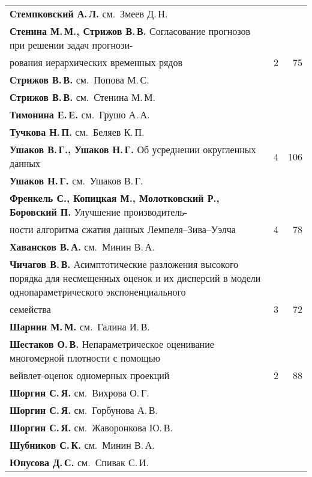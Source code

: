 {\begin{tabular}{p{388pt}rr}
\textbf{Стемпковский А.\,Л.} см.\ Змеев Д.\,Н.&&\\[-.35pt]
\textbf{Стенина М.\,М., Стрижов В.\,В.} Согласование прогнозов при
решении задач прогнози-\linebreak
\\[-12pt]
\hspace*{21pt}рования иерархических временных рядов&2&75\\[-.35pt]
\textbf{Стрижов В.\,В.} см.\ Попова М.\,С.&&\\[-.35pt]
\textbf{Стрижов В.\,В.} см.\ Стенина М.\,М.&&\\[-.35pt]
\textbf{Тимонина Е.\,Е.} см.\ Грушо А.\,А.&&\\[-.35pt]
\textbf{Тучкова Н.\,П.} см.\ Беляев К.\,П.&&\\[-.35pt]
\textbf{Ушаков В.\,Г., Ушаков Н.\,Г.} Об усреднении округленных
данных&4&106\\[-.35pt]
\textbf{Ушаков Н.\,Г.} см.\ Ушаков В.\,Г.&&\\[-.35pt]
\textbf{Френкель С., Копицкая М., Молотковский Р., Боровский П.}
Улучшение производитель-\linebreak
\\[-12pt]
\hspace*{21pt}ности алгоритма сжатия данных Лемпеля--Зива--Уэлча&4&78\\[-.35pt]
\textbf{Хавансков В.\,А.} см.\ Минин В.\,А.&&\\[-.35pt]
\hangindent=21pt\noindent\textbf{Чичагов В.\,В.} Асимптотические
разложения высокого порядка для
несмещенных оценок и их дисперсий в модели однопараметрического
экспоненциального\linebreak
\\[-12pt]
\hspace*{21pt}се\-мей\-ст\-ва&3&72\\[-.35pt]
\textbf{Шарнин М.\,М.} см.\ Галина И.\,В.&&\\[-.35pt]
\textbf{Шестаков О.\,В.} Непараметрическое оценивание многомерной
плотности с помощью\linebreak
\\[-12pt]
\hspace*{21pt}вейвлет-оценок одномерных проекций&2&88\\[-.35pt]
\textbf{Шоргин С.\,Я.} см.\ Вихрова О.\,Г.&&\\[-.35pt]
\textbf{Шоргин С.\,Я.} см.\ Горбунова А.\,В.&&\\[-.35pt]
\textbf{Шоргин С.\,Я.} см.\ Жаворонкова Ю.\,В.&&\\[-.35pt]
\textbf{Шубников С.\,К.} см.\ Минин В.\,А.&&\\[-.35pt]
\textbf{Юнусова Д.\,С.} см.\ Спивак С.\,И.&&\\[-.35pt]
\end{tabular}
}


